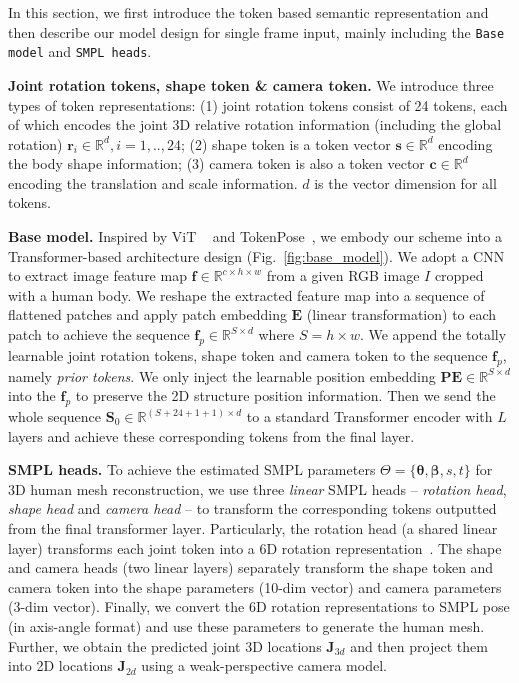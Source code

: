 In this section, we first introduce the token based semantic representation and then describe our model design for single frame input, mainly including the \verb|Base model| and \verb|SMPL heads|.



 {\bf Joint rotation tokens, shape token \& camera token.} We introduce three types of token representations: (1) joint rotation tokens consist of 24 tokens, each of which encodes the joint 3D relative rotation information (including the global rotation) ${\boldsymbol{r}_i\in \mathbb{R}^d}, i=1,..,24$; (2) shape token is a token vector $\boldsymbol{s}\in \mathbb{R}^d$ encoding the body shape information; (3) camera token is also a token vector $\boldsymbol{c}\in \mathbb{R}^d$ encoding the translation and scale information. $d$ is the vector dimension for all tokens.

{\bf Base model.} Inspired by ViT ~\citep{vit:dosovitskiy2020image} and TokenPose~\citep{tokenpose:li2021tokenpose}, we embody our scheme into a Transformer-based architecture design (Fig.~\ref{fig:base_model}). We adopt a CNN to extract image feature map $\boldsymbol{f} \in \mathbb{R}^{c\times h \times w}$ from a given RGB image $I$ cropped with a human body. We reshape the extracted feature map into a sequence of flattened patches and apply patch embedding $\mathbf{E}$ (linear transformation) to each patch to achieve the sequence $\boldsymbol{f}_p \in \mathbb{R}^{S\times d}$ where $S=h\times w$. We append the totally learnable joint rotation tokens, shape token and camera token to the sequence $\boldsymbol{f}_p$, namely \textit{prior tokens}.
We only inject the learnable position embedding $\mathbf{PE} \in \mathbb{R}^{S\times d}$ into the $\boldsymbol{f}_p$ to preserve the 2D structure position information. Then we send the whole sequence $\boldsymbol{S}_0 \in \mathbb{R}^{(S+24+1+1)\times d}$ to a standard Transformer encoder with $L$ layers and achieve these corresponding tokens from the final layer. 


{\bf SMPL heads.} To achieve the estimated SMPL parameters $\Theta=\{\boldsymbol{\theta}, \boldsymbol{\beta}, s, t\}$ for 3D human mesh reconstruction, we use three \textit{linear} SMPL heads -- \textit{rotation head}, \textit{shape head} and \textit{camera head} -- to transform the corresponding tokens outputted from the final transformer layer. Particularly, the rotation head (a shared linear layer) transforms each joint token into a 6D rotation representation~\citep{rot6d:zhou2019continuity}. %
The shape and camera heads (two linear layers) separately transform the shape token and camera token into the shape parameters (10-dim vector) and camera parameters (3-dim vector). Finally, we convert the 6D rotation representations to SMPL pose (in axis-angle format) and use these parameters to generate the human mesh. Further, we obtain the predicted joint 3D locations $\boldsymbol{J}_{3d}$ and then project them into 2D locations $\boldsymbol{J}_{2d}$ using a weak-perspective camera model.


